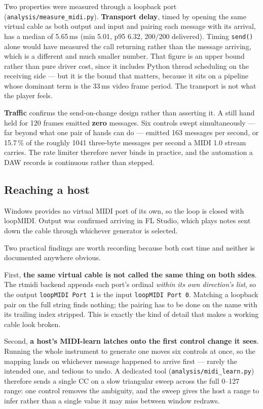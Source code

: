 \documentclass[a4paper,10pt,twocolumn]{article}
\newcommand{\code}[1]{\texttt{\small #1}}
\begin{document}
Two properties were measured through a loopback port
(\code{analysis/measure\_midi.py}). \textbf{Transport delay}, timed by opening
the same virtual cable as both output and input and pairing each message with
its arrival, has a median of 5.65\,ms (min 5.01, p95 6.32, 200/200 delivered).
Timing \code{send()} alone would have measured the call returning rather than
the message arriving, which is a different and much smaller number. That figure
is an upper bound rather than pure driver cost, since it includes Python thread
scheduling on the receiving side --- but it is the bound that matters, because
it sits on a pipeline whose dominant term is the 33\,ms video frame period. The
transport is not what the player feels.

\textbf{Traffic} confirms the send-on-change design rather than asserting it. A
still hand held for 120 frames emitted \textbf{zero} messages. Six controls
swept simultaneously --- far beyond what one pair of hands can do --- emitted
163 messages per second, or 15.7\,\% of the roughly 1041 three-byte messages
per second a MIDI 1.0 stream carries. The rate limiter therefore never binds in
practice, and the automation a DAW records is continuous rather than stepped.

\subsection{Reaching a host}

Windows provides no virtual MIDI port of its own, so the loop is closed with
loopMIDI. Output was confirmed arriving in FL Studio, which plays notes sent
down the cable through whichever generator is selected.

Two practical findings are worth recording because both cost time and neither
is documented anywhere obvious.

First, \textbf{the same virtual cable is not called the same thing on both
sides}. The rtmidi backend appends each port's ordinal \emph{within its own
direction's list}, so the output \code{loopMIDI Port 1} is the input
\code{loopMIDI Port 0}. Matching a loopback pair on the full string finds
nothing; the pairing has to be done on the name with its trailing index
stripped. This is exactly the kind of detail that makes a working cable look
broken.

Second, \textbf{a host's MIDI-learn latches onto the first control change it
sees}. Running the whole instrument to generate one moves six controls at once,
so the mapping lands on whichever message happened to arrive first --- rarely
the intended one, and tedious to undo. A dedicated tool
(\code{analysis/midi\_learn.py}) therefore sends a single CC on a slow
triangular sweep across the full 0--127 range: one control removes the
ambiguity, and the sweep gives the host a range to infer rather than a single
value it may miss between window redraws.
\end{document}
